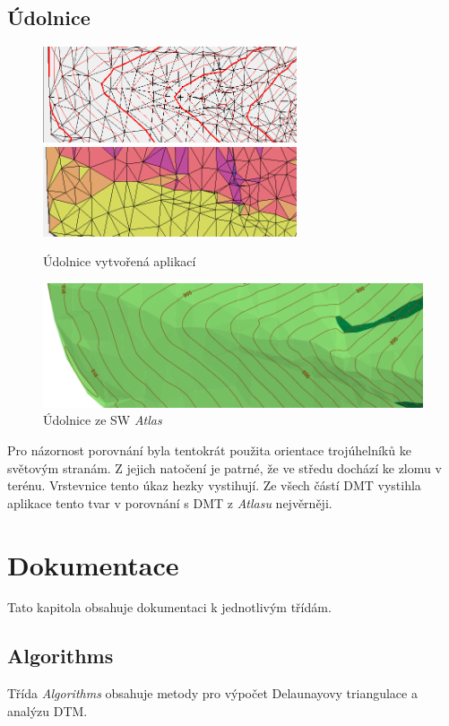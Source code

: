 \documentclass[a4paper, 12pt]{article}
\begin{document}
\subsection{Údolnice}
\begin{figure}[h!]
	\centering
	\includegraphics[width=7.5cm]{./pictures/kupec_thalweg_contours.png}
	\includegraphics[width=7.5cm]{./pictures/kupec_thalweg_aspect.png}
	\caption{Údolnice vytvořená aplikací}
\end{figure}

\begin{figure}[h!]
	\centering
	\includegraphics[width=15cm]{./pictures/atlas_thalweg.png}
	\caption{Údolnice ze SW \textit{Atlas}}
\end{figure}

Pro názornost porovnání byla tentokrát použita orientace trojúhelníků ke světovým stranám. Z jejich natočení je patrné, že ve středu dochází ke zlomu v terénu. Vrstevnice tento úkaz hezky vystihují. Ze všech částí DMT vystihla aplikace tento tvar v porovnání s DMT z \textit{Atlasu} nejvěrněji.
\clearpage
 
\section{Dokumentace}
Tato kapitola obsahuje dokumentaci k jednotlivým třídám.

\subsection{Algorithms}
Třída \textit{Algorithms} obsahuje metody pro výpočet Delaunayovy triangulace a analýzu DTM.
\end{document}

